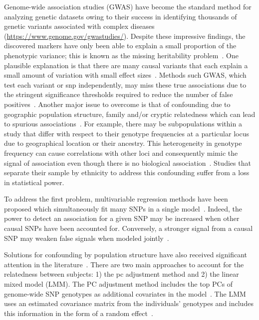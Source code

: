 Genome-wide association studies (GWAS) have become the standard method for analyzing genetic datasets owing to their success in identifying thousands of genetic variants associated with complex diseases (\url{https://www.genome.gov/gwastudies/}).
Despite these impressive findings, the discovered markers have only been able to explain a small proportion of the phenotypic variance; this is known as the missing heritability problem~\citep{manolio2009finding}.
One plausible explanation is that there are many causal variants that each explain a small amount of variation with small effect sizes~\citep{yang2010common}.
Methods such GWAS, which test each variant or \ac{snp} independently, may miss these true associations due to the stringent significance thresholds required to reduce the number of false positives~\citep{manolio2009finding}. 
Another major issue to overcome is that of confounding due to geographic population structure, family and/or cryptic relatedness which can lead to spurious associations~\citep{astle2009population}.
For example, there may be subpopulations within a study that differ with respect to their genotype frequencies at a particular locus due to geographical location or their ancestry.
This heterogeneity in genotype frequency can cause correlations with other loci and consequently mimic the signal of association even though there is no biological association~\citep{song2015testing,marchini2004effects}. 
Studies that separate their sample by ethnicity to address this confounding suffer from a loss in statistical power. 


To address the first problem, multivariable regression methods have been proposed which simultaneously fit many SNPs in a single model~\citep{hoggart2008simultaneous,li2010bayesian}. Indeed, the power to detect an association for a given SNP may be increased when other causal SNPs have been accounted for. Conversely, a stronger signal from a causal SNP may weaken false signals when modeled jointly~\citep{hoggart2008simultaneous}. 

Solutions for confounding by population structure have also received significant attention in the literature~\citep{lippert2011fast,kang2010variance,yu2006unified,eu2014comparison}. 
There are two main approaches to account for the relatedness between subjects: 1) the \ac{pc} adjustment method and 2) the linear mixed model (LMM).
The PC adjustment method includes the top PCs of genome-wide SNP genotypes as additional covariates in the model~\citep{price2006principal}. 
The LMM uses an estimated covariance matrix from the individuals' genotypes and includes this information in the form of a random effect~\cite{astle2009population}. 

